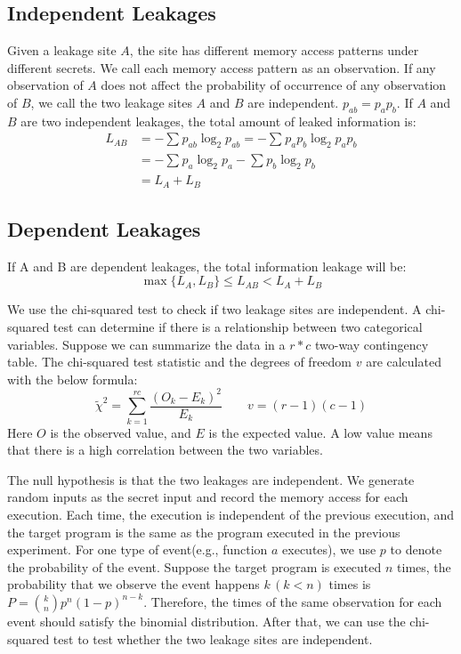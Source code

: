 \subsection{Independent Leakages}
Given a leakage site $A$, the site has different memory access patterns under different secrets. We call each memory access pattern as an observation. If any observation of $A$ does not affect the probability of occurrence of any observation of $B$, we call the two leakage sites $A$ and $B$ are independent. $p_{ab} = p_ap_b$.
If $A$ and $B$ are two independent leakages, the total amount of leaked information is:
\begin{align*} 
L_{\mathit{AB}} &= - \sum_{}p_{ab}\log_2p_{ab} = - \sum_{}p_ap_b\log_2p_ap_b \\
                &= - \sum_{}p_{a}\log_2p_{a} - \sum_{}p_{b}\log_2p_{b} \\
                &= L_A + L_B
\end{align*} 

\subsection{Dependent Leakages}
If A and B are dependent leakages, the total information leakage will be:
\[\max{\{L_A, L_B\}}  \leq L_{\mathit{AB}} < L_A + L_B\]

We use the chi-squared test to check if two leakage sites are independent. A chi-squared test can determine if there is a relationship between two categorical variables. Suppose we can summarize the data in a $r*c$ two-way contingency table. The chi-squared test statistic and the degrees of freedom $v$ are calculated with the below formula:
\[\tilde{\chi}^2=\sum_{k=1}^{rc} \frac{(O_k - E_k)^2}{E_k} \qquad	 v = (r - 1)(c - 1)\]
Here $O$ is the observed value, and $E$ is the expected value. A low value means that there is a high correlation between the two variables. 

The null hypothesis is that the two leakages are independent.
We generate random inputs as the secret input and record the memory access for each execution. Each time, the execution is independent of the previous execution, and the target program is the same as the program executed in the previous experiment. For one type of event(e.g., function $a$ executes), we use $p$ to denote the probability of the event. Suppose the target program is executed $n$ times, the probability that we observe the event happens $k \,(k < n)$ times is $P = \binom{k}{n}p^n(1-p)^{n-k}$. Therefore, the times of the same observation for each event should satisfy the binomial distribution. After that, we can use the chi-squared test to test whether the two leakage sites are independent.

